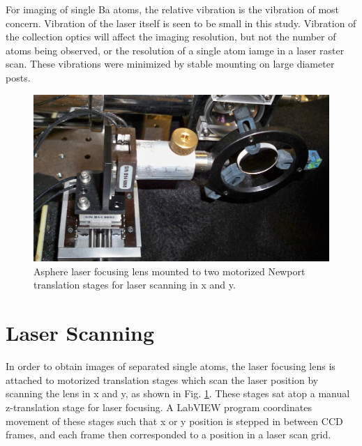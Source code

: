


For imaging of single Ba atoms, the relative vibration is the vibration of most concern.  Vibration of the laser itself is seen to be small in this study.  Vibration of the collection optics will affect the imaging resolution, but not the number of atoms being observed, or the resolution of a single atom iamge in a laser raster scan.  These vibrations were minimized by stable mounting on large diameter posts.

\vspace{10mm}

\begin{figure} [H]
        \centering
                \includegraphics[width=.5\textwidth]{figures/stages_2.JPG}
                \caption{Asphere laser focusing lens mounted to two motorized Newport translation stages for laser scanning in x and y.}
\label{fig:laserStages}
\end{figure}


\section{Laser Scanning}
\label{sec:laserscanning}

In order to obtain images of separated single atoms, the laser focusing lens is attached to motorized translation stages which scan the laser position by scanning the lens in x and y, as shown in Fig. \ref{fig:laserStages}.  These stages sat atop a manual z-translation stage for laser focusing.  A LabVIEW program coordinates movement of these stages such that x or y position is stepped in between CCD frames, and each frame then corresponded to a position in a laser scan grid.


